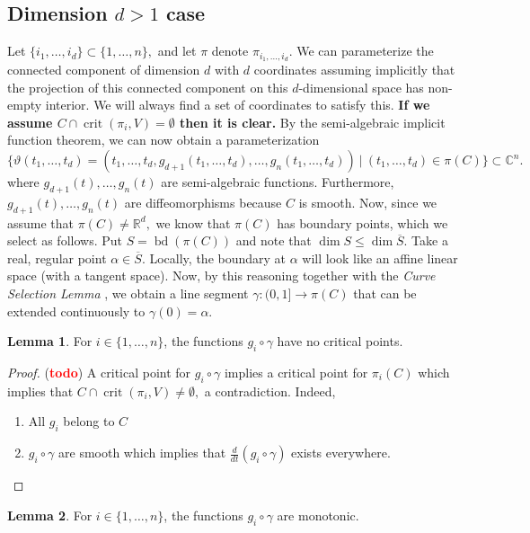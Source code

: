 \documentclass[10pt]{article}
\theoremstyle{definition}
\newtheorem{lemma}{Lemma}
\newcommand{\C}{\mathbb{C}}
\newcommand{\R}{\mathbb{R}}
\def\td{(\textcolor{red}{{\bf todo}})}
\def\td{(\textcolor{red}{{\bf todo}}) }
\DeclareMathOperator{\bd}{bd}
\DeclareMathOperator{\crit}{crit}
\begin{document}
\subsection{Dimension $d>1$ case}
Let $\{i_1,\hdots,i_d\} \subset \{1,\hdots,n\},$ and let $\pi$ denote $\pi_{i_1,\hdots,i_d}.$ We can parameterize the connected component of dimension $d$ with $d$ coordinates assuming implicitly that the projection of this connected component on this $d$-dimensional space has non-empty interior. We will always find a set of coordinates to satisfy this. \textbf{If we assume $C \cap \crit(\pi_i,V) = \emptyset$ then it is clear.} By the semi-algebraic implicit function theorem, we can now obtain a parameterization
\[
\big\{\vartheta(t_1,\hdots,t_d) = \left(t_1,\hdots,t_d,g_{d+1}(t_1,\hdots,t_d),\hdots,g_{n}(t_1,\hdots,t_d)\right)~|~ (t_1,\hdots,t_d) \in \pi(C)\big\} \subset \C^n.
\]
where $g_{d+1}(t),\hdots,g_n(t)$ are semi-algebraic functions.  Furthermore, $g_{d+1}(t),\hdots,g_n(t)$ are diffeomorphisms because $C$ is smooth. Now, since we assume that $\pi(C) \not = \R^d,$ we know that $\pi(C)$ has boundary points, which we select as follows. Put $S = \bd\left( \pi(C) \right)$ and note that $\dim S \leq \dim \overline{S}.$ Take a real, regular point $\alpha \in \overline{S}.$ Locally, the boundary at $\alpha$ will look like an affine linear space (with a tangent space). Now, by this reasoning together with the \textit{Curve Selection Lemma} \cite{CurveSelectionLemma},  
we obtain a line segment $\gamma: (0,1] \rightarrow \pi(C)$ that can be extended continuously to $\gamma(0)=\alpha.$ 
%
\begin{lemma}
For $i \in \{1,\hdots,n\}$, the functions $g_i \circ \gamma$ have no critical points. 
\end{lemma}
%
%
\begin{proof}
\td A critical point for $g_i \circ \gamma$ implies a critical point for $\pi_i(C)$ which implies that $C \cap \crit(\pi_i,V) \not = \emptyset,$ a contradiction. Indeed, 
\begin{enumerate}
    \item All $g_i$ belong to $C$
    \item $g_i \circ \gamma$ are smooth which implies that $\frac{d}{dt}\left(g_i \circ \gamma \right)$ exists everywhere. 
\end{enumerate}
\end{proof}
%
%
\begin{lemma}
For $i \in \{1,\hdots,n\}$, the functions $g_i \circ \gamma$ are monotonic. 
\end{lemma}
\end{document}
